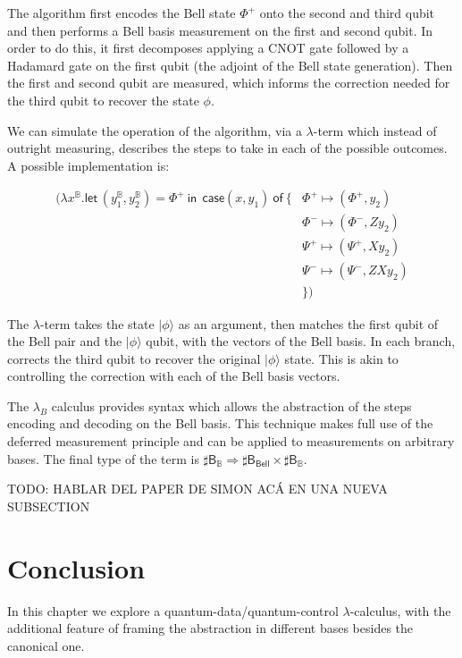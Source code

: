 \documentclass[runningheads,orivec,envcountsame,envcountsect]{llncs}
\newcommand\ket[1]{\ensuremath{|#1\rangle}}
\def\Pair#1#2{(#1,#2)} %
\def\Lam#1#2#3{\lambda#1^{#2}{.}#3} %
\def\letkeyword{\mathsf{let}}
\def\inkeyword{\mathsf{in}}
\def\LetP#1#2#3#4#5#6{\letkeyword\,\Pair{#1^{#2}}{#3^{#4}}=#5~\inkeyword~#6}
\def\Arr{\Rightarrow}
\newcommand\B{\mathbb B}
\newcommand{\Bell}{\mathsf{Bell}}
\newcommand{\lambdaB}{\lambda_B}
\newcommand\basis[1]{\ensuremath{\mathsf{B}_{#1}}}
\begin{document}
The algorithm first encodes the Bell state $\Phi^+$ onto the second and third qubit and then performs a Bell basis measurement on the first and second qubit. In order to do this, it first decomposes applying a CNOT gate followed by a Hadamard gate on the first qubit (the adjoint of the Bell state generation). Then the first and second qubit are measured, which informs the correction needed for the third qubit to recover the state $\phi$.

We can simulate the operation of the algorithm, via a $\lambda$-term which instead of outright measuring, describes the steps to take in each of the possible outcomes. A possible implementation is:

\begin{align*}
    (\Lam{x}{\B}{\LetP{y_1}{\B}{y_2}{\B}{\Phi^+}{ ~\mathsf{case } \Pair{x}{y_1}  ~\mathsf{ of }~\{ &\Phi^+\mapsto \Pair{\Phi^+}{y_2}\\
    &\Phi^-\mapsto \Pair{\Phi^-}{Z y_2}\\
    &\Psi^+\mapsto \Pair{\Psi^+}{X y_2}\\
    &\Psi^-\mapsto \Pair{\Psi^-}{ZX y_2}\\
    &\}}})
\end{align*}

The $\lambda$-term takes the state $\ket{\phi}$ as an argument, then matches the first qubit of the Bell pair and the $\ket{\phi}$ qubit, with the vectors of the Bell basis. In each branch, corrects the third qubit to recover the original $\ket{\phi}$ state. This is akin to controlling the correction with each of the Bell basis vectors.

The $\lambdaB$ calculus provides syntax which allows the abstraction of the steps encoding and decoding on the Bell basis. This technique makes full use of the deferred measurement principle and can be applied to measurements on arbitrary bases. The final type of the term is $\sharp\basis{\B}\Arr \sharp\basis{\Bell}\times \sharp\basis{\B}$.

{\color{red} TODO: HABLAR DEL PAPER DE SIMON ACÁ EN UNA NUEVA SUBSECTION}

\section{Conclusion}\label{sec:conclusion}

In this chapter we explore a quantum-data/quantum-control $\lambda$-calculus, with the additional feature of framing the abstraction in different bases besides the canonical one.
\end{document}
